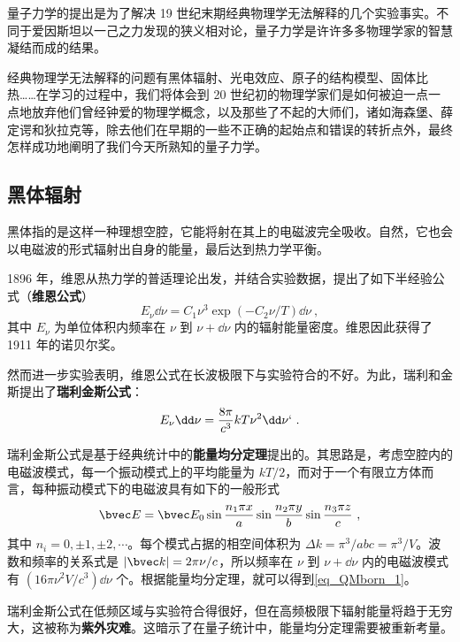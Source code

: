 
量子力学的提出是为了解决 19 世纪末期经典物理学无法解释的几个实验事实。不同于爱因斯坦以一己之力发现的狭义相对论，量子力学是许许多多物理学家的智慧凝结而成的结果。

经典物理学无法解释的问题有黑体辐射、光电效应、原子的结构模型、固体比热……在学习的过程中，我们将体会到 20 世纪初的物理学家们是如何被迫一点一点地放弃他们曾经钟爱的物理学概念，以及那些了不起的大师们，诸如海森堡、薛定谔和狄拉克等，除去他们在早期的一些不正确的起始点和错误的转折点外，最终怎样成功地阐明了我们今天所熟知的量子力学。

\subsection{黑体辐射}
黑体指的是这样一种理想空腔，它能将射在其上的电磁波完全吸收。自然，它也会以电磁波的形式辐射出自身的能量，最后达到热力学平衡。

1896 年，维恩从热力学的普适理论出发，并结合实验数据，提出了如下半经验公式（\textbf{维恩公式}）
\begin{equation}
E_\nu \dd \nu=C_1\nu^3 \exp(-C_2 \nu /T) \dd \nu~,
\end{equation}
其中 $E_\nu$ 为单位体积内频率在 $\nu$ 到 $\nu+\dd \nu$ 内的辐射能量密度。维恩因此获得了 1911 年的诺贝尔奖。

然而进一步实验表明，维恩公式在长波极限下与实验符合的不好。为此，瑞利和金斯提出了\textbf{瑞利金斯公式}：
\begin{equation}\label{eq_QMborn_1}
E_\nu \dd \nu=\frac{8\pi}{c^3}kT\nu^2 \dd \nu`~.
\end{equation}

瑞利金斯公式是基于经典统计中的\textbf{能量均分定理}提出的。其思路是，考虑空腔内的电磁波模式，每一个振动模式上的平均能量为 $kT/2$，而对于一个有限立方体而言，每种振动模式下的电磁波具有如下的一般形式
\begin{equation}
\bvec E=\bvec E_0 \sin\frac{n_1\pi x}{a} \sin\frac{n_2\pi y}{b}\sin \frac{n_3\pi z}{c}~,
\end{equation}
其中 $n_i=0,\pm 1,\pm 2,\cdots$。每个模式占据的相空间体积为 $\Delta k=\pi^3/abc=\pi^3/V$。波数和频率的关系式是 $|\bvec k| = 2\pi\nu/c$，所以频率在 $\nu$ 到 $\nu+\dd \nu$ 内的电磁波模式有 $(16\pi \nu^2V/c^3 )\dd \nu$ 个。根据能量均分定理，就可以得到\autoref{eq_QMborn_1}。

瑞利金斯公式在低频区域与实验符合得很好，但在高频极限下辐射能量将趋于无穷大，这被称为\textbf{紫外灾难}。这暗示了在量子统计中，能量均分定理需要被重新考量。

